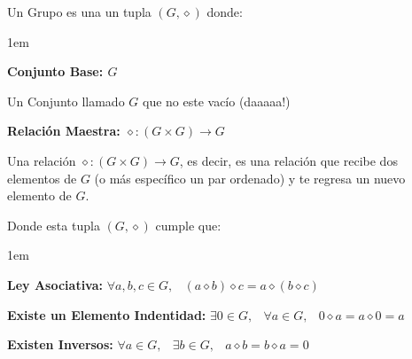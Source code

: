\documentclass[12pt, fleqn]{report}                             %
\newenvironment{Indentation}[1][0.75em]                         %
        {\begin{adjustwidth}{#1}{}}                                 %
        {\end{adjustwidth}}                                         %
\DeclareMathOperator \Space     {\quad}                         %
\DeclareMathOperator \MiniSpace {\;}                            %
\theoremstyle{break}                                            %
\begin{document}
                Un Grupo es una un tupla $(G, \diamond)$ donde:
                \begin{Indentation}[1em]
                \begin{itemize}
                \small{
                    
                    \item
                        \textbf{Conjunto Base: $G$}

                        Un Conjunto llamado $G$ que no este vacío (daaaaa!)

                    \item
                        \textbf{Relación Maestra: $\diamond: (G \times  G) \to G$}

                        Una relación $\diamond: (G \times  G) \to G$, es decir, es una relación
                        que recibe dos elementos de $G$ (o más específico un par ordenado) y te
                        regresa un nuevo elemento de $G$.
                }
                \end{itemize}
                \end{Indentation}


                Donde esta tupla $(G, \diamond)$ cumple que:
                \begin{Indentation}[1em]
                \begin{itemize}
                \small{
                    
                    \item 
                        \textbf{Ley Asociativa:}
                        $\forall a, b, c \in G, \MiniSpace
                            (a \diamond b) \diamond c = a \diamond (b \diamond c)$

                    \item 
                        \textbf{Existe un Elemento Indentidad:}
                        $\exists 0 \in G, \MiniSpace
                            \forall a \in G, \MiniSpace 0 \diamond a = a \diamond 0 = a$

                    \item 
                        \textbf{Existen Inversos:}
                        $\forall a \in G, \MiniSpace
                                \exists b \in G, \MiniSpace
                                    a \diamond b = b \diamond a = 0$

                }
                \end{itemize}
                \end{Indentation}
\end{document}
